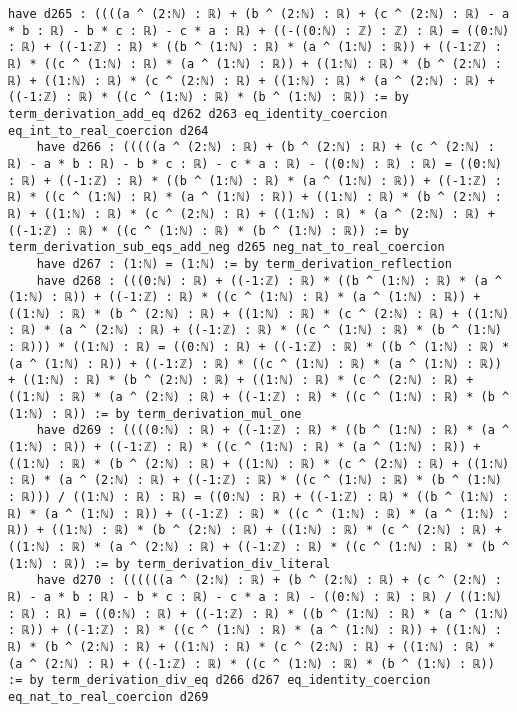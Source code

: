 \documentclass{article}
\begin{document}
\begin{tcolorbox}[colback=white!10, width=\linewidth]
\begin{lstlisting}[language=Lean4]
    have d265 : ((((a ^ (2:ℕ) : ℝ) + (b ^ (2:ℕ) : ℝ) + (c ^ (2:ℕ) : ℝ) - a * b : ℝ) - b * c : ℝ) - c * a : ℝ) + ((-((0:ℕ) : ℤ) : ℤ) : ℝ) = ((0:ℕ) : ℝ) + ((-1:ℤ) : ℝ) * ((b ^ (1:ℕ) : ℝ) * (a ^ (1:ℕ) : ℝ)) + ((-1:ℤ) : ℝ) * ((c ^ (1:ℕ) : ℝ) * (a ^ (1:ℕ) : ℝ)) + ((1:ℕ) : ℝ) * (b ^ (2:ℕ) : ℝ) + ((1:ℕ) : ℝ) * (c ^ (2:ℕ) : ℝ) + ((1:ℕ) : ℝ) * (a ^ (2:ℕ) : ℝ) + ((-1:ℤ) : ℝ) * ((c ^ (1:ℕ) : ℝ) * (b ^ (1:ℕ) : ℝ)) := by term_derivation_add_eq d262 d263 eq_identity_coercion eq_int_to_real_coercion d264
    have d266 : (((((a ^ (2:ℕ) : ℝ) + (b ^ (2:ℕ) : ℝ) + (c ^ (2:ℕ) : ℝ) - a * b : ℝ) - b * c : ℝ) - c * a : ℝ) - ((0:ℕ) : ℝ) : ℝ) = ((0:ℕ) : ℝ) + ((-1:ℤ) : ℝ) * ((b ^ (1:ℕ) : ℝ) * (a ^ (1:ℕ) : ℝ)) + ((-1:ℤ) : ℝ) * ((c ^ (1:ℕ) : ℝ) * (a ^ (1:ℕ) : ℝ)) + ((1:ℕ) : ℝ) * (b ^ (2:ℕ) : ℝ) + ((1:ℕ) : ℝ) * (c ^ (2:ℕ) : ℝ) + ((1:ℕ) : ℝ) * (a ^ (2:ℕ) : ℝ) + ((-1:ℤ) : ℝ) * ((c ^ (1:ℕ) : ℝ) * (b ^ (1:ℕ) : ℝ)) := by term_derivation_sub_eqs_add_neg d265 neg_nat_to_real_coercion
    have d267 : (1:ℕ) = (1:ℕ) := by term_derivation_reflection
    have d268 : (((0:ℕ) : ℝ) + ((-1:ℤ) : ℝ) * ((b ^ (1:ℕ) : ℝ) * (a ^ (1:ℕ) : ℝ)) + ((-1:ℤ) : ℝ) * ((c ^ (1:ℕ) : ℝ) * (a ^ (1:ℕ) : ℝ)) + ((1:ℕ) : ℝ) * (b ^ (2:ℕ) : ℝ) + ((1:ℕ) : ℝ) * (c ^ (2:ℕ) : ℝ) + ((1:ℕ) : ℝ) * (a ^ (2:ℕ) : ℝ) + ((-1:ℤ) : ℝ) * ((c ^ (1:ℕ) : ℝ) * (b ^ (1:ℕ) : ℝ))) * ((1:ℕ) : ℝ) = ((0:ℕ) : ℝ) + ((-1:ℤ) : ℝ) * ((b ^ (1:ℕ) : ℝ) * (a ^ (1:ℕ) : ℝ)) + ((-1:ℤ) : ℝ) * ((c ^ (1:ℕ) : ℝ) * (a ^ (1:ℕ) : ℝ)) + ((1:ℕ) : ℝ) * (b ^ (2:ℕ) : ℝ) + ((1:ℕ) : ℝ) * (c ^ (2:ℕ) : ℝ) + ((1:ℕ) : ℝ) * (a ^ (2:ℕ) : ℝ) + ((-1:ℤ) : ℝ) * ((c ^ (1:ℕ) : ℝ) * (b ^ (1:ℕ) : ℝ)) := by term_derivation_mul_one
    have d269 : ((((0:ℕ) : ℝ) + ((-1:ℤ) : ℝ) * ((b ^ (1:ℕ) : ℝ) * (a ^ (1:ℕ) : ℝ)) + ((-1:ℤ) : ℝ) * ((c ^ (1:ℕ) : ℝ) * (a ^ (1:ℕ) : ℝ)) + ((1:ℕ) : ℝ) * (b ^ (2:ℕ) : ℝ) + ((1:ℕ) : ℝ) * (c ^ (2:ℕ) : ℝ) + ((1:ℕ) : ℝ) * (a ^ (2:ℕ) : ℝ) + ((-1:ℤ) : ℝ) * ((c ^ (1:ℕ) : ℝ) * (b ^ (1:ℕ) : ℝ))) / ((1:ℕ) : ℝ) : ℝ) = ((0:ℕ) : ℝ) + ((-1:ℤ) : ℝ) * ((b ^ (1:ℕ) : ℝ) * (a ^ (1:ℕ) : ℝ)) + ((-1:ℤ) : ℝ) * ((c ^ (1:ℕ) : ℝ) * (a ^ (1:ℕ) : ℝ)) + ((1:ℕ) : ℝ) * (b ^ (2:ℕ) : ℝ) + ((1:ℕ) : ℝ) * (c ^ (2:ℕ) : ℝ) + ((1:ℕ) : ℝ) * (a ^ (2:ℕ) : ℝ) + ((-1:ℤ) : ℝ) * ((c ^ (1:ℕ) : ℝ) * (b ^ (1:ℕ) : ℝ)) := by term_derivation_div_literal
    have d270 : ((((((a ^ (2:ℕ) : ℝ) + (b ^ (2:ℕ) : ℝ) + (c ^ (2:ℕ) : ℝ) - a * b : ℝ) - b * c : ℝ) - c * a : ℝ) - ((0:ℕ) : ℝ) : ℝ) / ((1:ℕ) : ℝ) : ℝ) = ((0:ℕ) : ℝ) + ((-1:ℤ) : ℝ) * ((b ^ (1:ℕ) : ℝ) * (a ^ (1:ℕ) : ℝ)) + ((-1:ℤ) : ℝ) * ((c ^ (1:ℕ) : ℝ) * (a ^ (1:ℕ) : ℝ)) + ((1:ℕ) : ℝ) * (b ^ (2:ℕ) : ℝ) + ((1:ℕ) : ℝ) * (c ^ (2:ℕ) : ℝ) + ((1:ℕ) : ℝ) * (a ^ (2:ℕ) : ℝ) + ((-1:ℤ) : ℝ) * ((c ^ (1:ℕ) : ℝ) * (b ^ (1:ℕ) : ℝ)) := by term_derivation_div_eq d266 d267 eq_identity_coercion eq_nat_to_real_coercion d269

\end{lstlisting}
\end{tcolorbox}
\end{document}
